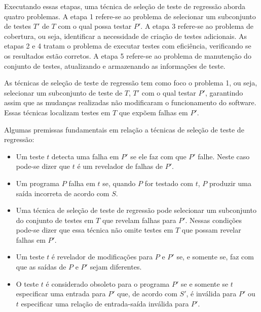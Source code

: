 Executando essas etapas, uma técnica de seleção de teste de regressão aborda quatro problemas. A etapa 1 refere-se ao problema de selecionar um subconjunto de testes $T'$ de $T$ com o qual possa testar $P'$. A etapa 3 refere-se ao problema de cobertura, ou seja, identificar a necessidade de criação de testes adicionais. As etapas 2 e 4 tratam o problema de executar testes com eficiência, verificando se os resultados estão corretos. A etapa 5 refere-se ao problema de manutenção do conjunto de testes, atualizando e armazenando as informações de teste.

As técnicas de seleção de teste de regressão tem como foco o problema 1, ou seja, selecionar um subconjunto de teste de $T$, $T'$ com o qual testar $P'$, garantindo assim que as mudanças realizadas não modificaram o funcionamento do software. Essas técnicas localizam testes em $T$ que expõem falhas em $P'$.

Algumas premissas fundamentais em relação a técnicas de seleção de teste de regressão: \cite{536955}
\begin{itemize}
    \item Um teste $t$ detecta uma falha em $P'$ se ele faz com que $P'$ falhe. Neste caso pode-se dizer que $t$ é um revelador de falhas de $P'$.
    \item Um programa $P$ falha em $t$ se, quando $P$ for testado com $t$, $P$ produzir uma saída incorreta de acordo com $S$.
    \item Uma técnica de seleção de teste de regressão pode selecionar um subconjunto do conjunto de testes em $T$ que revelam falhas para $P'$. Nessas condições pode-se dizer que essa técnica não omite testes em $T$ que possam revelar falhas em $P'$.
    \item Um teste $t$ é revelador de modificações para $P$ e $P'$ se, e somente se, faz com que as saídas de $P$ e $P'$ sejam diferentes.
    \item O teste $t$ é considerado obsoleto para o programa $P'$ se e somente se $t$ especificar uma entrada para $P'$ que, de acordo com $S'$, é inválida para $P'$ ou $t$ especificar uma relação de entrada-saída inválida para $P'$.
\end{itemize}


